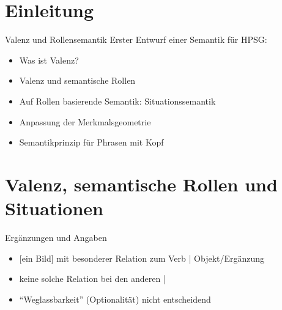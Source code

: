 \section{Einleitung}

\begin{frame}
  {Valenz und Rollensemantik}
  \onslide<+->
  \onslide<+->
  Erster Entwurf einer Semantik für HPSG:\\
  \Zeile
  \begin{itemize}[<+->]
    \item Was ist Valenz?
    \item Valenz und \alert{semantische Rollen}
    \item Auf Rollen basierende Semantik: \alert{Situationssemantik}
    \item Anpassung der Merkmalsgeometrie
    \item \alert{Semantikprinzip} für Phrasen mit Kopf
  \end{itemize}
  \Zeile
  \onslide<+->
  \centering 
\end{frame}

\section{Valenz, semantische Rollen und Situationen}

\begin{frame}
  {Ergänzungen und Angaben}
  \onslide<+->
  \onslide<+->
  \begin{exe}
    \ex\label{ex:valenz034}
    \begin{xlist}
      \onslide<+->
      \onslide<+->
      \onslide<+->
    \end{xlist}
  \end{exe}
  \Halbzeile
  \begin{itemize}[<+->]
    \item \alert{[ein Bild]} mit besonderer Relation zum Verb | \alert{Objekt\slash Ergänzung}
    \item keine solche Relation bei den anderen | 
    \item "`Weglassbarkeit"' (Optionalität) nicht entscheidend
  \end{itemize}
\end{frame}

